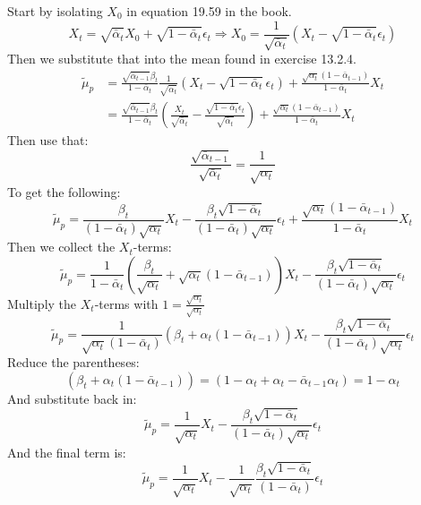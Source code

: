 \documentclass[12pt]{article}    %
\begin{document}
\exminorhard
Start by isolating $X_0$ in equation 19.59 in the book.
\begin{equation}
    X_t = \sqrt{\bar{\alpha}_t}X_0 + \sqrt{1-\bar{\alpha}_t}\epsilon_t \Rightarrow X_0 = \frac{1}{\sqrt{\bar{\alpha}_t}}(X_t - \sqrt{1-\bar{\alpha}_t} \epsilon_t)
\end{equation}
Then we substitute that into the mean found in exercise 13.2.4.
\begin{align}
    \tilde{\mu}_p &= \frac{\sqrt{\bar{\alpha}_{t-1}}\beta_t}{1-\bar{\alpha}_t} \frac{1}{\sqrt{\bar{\alpha}_t}} \left(X_t - \sqrt{1-\bar{\alpha}_t} \epsilon_t \right) + \frac{\sqrt{\alpha_t}(1-\bar{\alpha}_{t-1})}{1-\bar{\alpha}_t}X_t \\
    &= \frac{\sqrt{\bar{\alpha}_{t-1}}\beta_t}{1-\bar{\alpha}_t} \left( \frac{X_t}{\sqrt{\bar{\alpha}_t}} - \frac{\sqrt{1-\bar{\alpha}_t} \epsilon_t}{\sqrt{\bar{\alpha}_t}} \right) + \frac{\sqrt{\alpha_t}(1-\bar{\alpha}_{t-1})}{1-\bar{\alpha}_t}X_t
\end{align}
Then use that:
\begin{equation}
    \frac{\sqrt{\bar{\alpha}_{t-1}}}{\sqrt{\bar{\alpha}_t}} = \frac{1}{\sqrt{\alpha_t}}
\end{equation}
To get the following:
\begin{equation}
    \tilde{\mu}_p = \frac{\beta_t}{(1-\bar{\alpha}_t) \sqrt{\alpha_t}} X_t - \frac{\beta_t \sqrt{1-\bar{\alpha}_t} }{(1-\bar{\alpha}_t) \sqrt{\alpha_t}} \epsilon_t + \frac{\sqrt{\alpha_t}(1-\bar{\alpha}_{t-1})}{1-\bar{\alpha}_t}X_t
\end{equation}
Then we collect the $X_t$-terms:
\begin{equation}
    \tilde{\mu}_p = \frac{1}{1-\bar{\alpha}_{t}}\left( \frac{\beta_t}{\sqrt{\alpha_t}} + \sqrt{\alpha_t} (1-\bar{\alpha}_{t-1}) \right) X_t - \frac{\beta_t \sqrt{1-\bar{\alpha}_t} }{(1-\bar{\alpha}_t) \sqrt{\alpha_t}} \epsilon_t
\end{equation}
Multiply the $X_t$-terms with $1 = \frac{\sqrt{\alpha_t}}{\sqrt{\alpha_t}}$
\begin{equation}
    \tilde{\mu}_p = \frac{1}{\sqrt{\alpha_t} (1-\bar{\alpha}_{t})}\left( \beta_t + \alpha_t (1-\bar{\alpha}_{t-1}) \right) X_t - \frac{\beta_t \sqrt{1-\bar{\alpha}_t} }{(1-\bar{\alpha}_t) \sqrt{\alpha_t}} \epsilon_t
\end{equation}
Reduce the parentheses:
\begin{equation}
    \left( \beta_t + \alpha_t (1-\bar{\alpha}_{t-1}) \right) = \left( 1 - \alpha_t + \alpha_t - \bar{\alpha}_{t-1} \alpha_t \right) = 1 - \alpha_t
\end{equation}
And substitute back in:
\begin{equation}
    \tilde{\mu}_p = \frac{1}{\sqrt{\alpha_t}} X_t - \frac{\beta_t \sqrt{1-\bar{\alpha}_t} }{(1-\bar{\alpha}_t) \sqrt{\alpha_t}} \epsilon_t
\end{equation}
And the final term is:
\begin{equation}
    \tilde{\mu}_p = \frac{1}{\sqrt{\alpha_t}} X_t - \frac{1}{\sqrt{\alpha_t}} \frac{\beta_t \sqrt{1-\bar{\alpha}_t} }{(1-\bar{\alpha}_t)} \epsilon_t
\end{equation}
\end{document}
